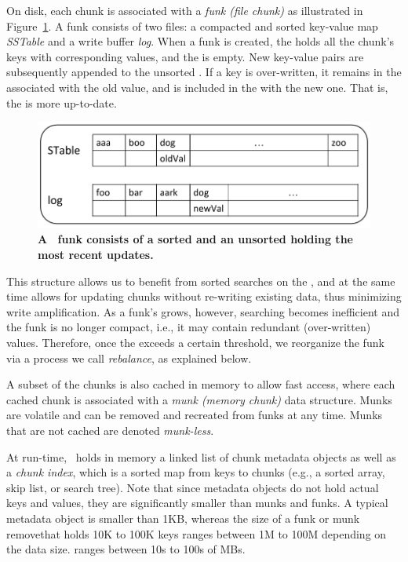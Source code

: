 On disk, each chunk is associated with a  \emph{funk (file chunk)} as illustrated in 
Figure~\ref{fig:funk}. A funk
consists of two files:   
a compacted and sorted  key-value map \emph{SSTable} and a write buffer \emph{log}. When a funk is created, the  holds all the chunk's keys with corresponding values, and the   is empty.
New key-value pairs are subsequently appended to the unsorted . If a key is over-written, it remains in the  associated with the old value, and is included in the  with the new one.
That is, the  is more up-to-date.

\begin{figure}[tb]
\centerline{
\includegraphics[width=\columnwidth]{funk.png}
}
\caption{\bf{A \sys\ funk consists of a sorted  and an unsorted  holding the most recent updates.}}
\label{fig:funk}
\end{figure}

This structure allows us to benefit from sorted searches on the , and at the same time
allows for updating chunks without re-writing existing data, thus minimizing write amplification.
As a funk's   grows, however, searching becomes inefficient   and  
the funk is no longer compact, i.e., it may contain redundant (over-written) values.
Therefore, once the   exceeds a certain threshold, we reorganize the funk
via a process we call \emph{rebalance}, as explained below.

A subset of the chunks is also cached in memory to allow fast access, where each cached chunk is associated with a
\emph{munk (memory chunk)}  data structure. 
Munks are volatile and can be removed and recreated from funks at any time.
Munks that are not cached are denoted \emph{munk-less}.

At run-time, \sys\ holds in memory a linked list of chunk metadata objects as well as 
a \emph{chunk index}, which is a sorted map from keys to chunks (e.g., a sorted array, skip list, or search tree).
Note that since metadata objects do not hold actual keys and values, they are significantly smaller than munks and funks. 
A typical metadata object is smaller than 1KB, whereas the size of a funk or munk 
remove{that holds 10K to 100K keys 
ranges between 1M to 100M depending on the data size.} 
ranges between 10s to 100s of MBs.

